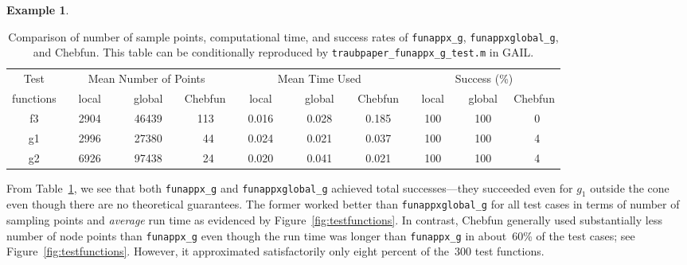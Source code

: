 \documentclass[review]{elsarticle}
\theoremstyle{definition}
\newtheorem{exmp}{Example}
\newcommand{\funappxg}{\texttt{funappx\_g}\xspace}
\newcommand{\funappxglobalg}{\texttt{funappxglobal\_g\xspace}}
\begin{document}
\begin{exmp}
%
\begin{table}[bt]
\centering
\caption{Comparison of number of sample points, computational time,  and success
rates of \funappxg, \funappxglobalg, and Chebfun.
This table can be conditionally reproduced by
\texttt{traubpaper\_funappx\_g\_test.m} in GAIL.}
\label{tab:localVsGlobalVsChebfun}
{\footnotesize
\setlength{\tabcolsep}{.3em} %
		\begin{tabular}{ccrccrccrccrccrccrccrccrccrc}		
			Test      &    \multicolumn{9}{c}{Mean Number of Points}   & \multicolumn{9}{c}{Mean Time Used}  & \multicolumn{9}{c}{Success (\%)}
			\\  functions &  \multicolumn{3}{c}{local}  &  \multicolumn{3}{c}{global }  &  \multicolumn{3}{c}{Chebfun }  & \multicolumn{3}{c}{local}  &  \multicolumn{3}{c}{global }  &  \multicolumn{3}{c}{Chebfun } & \multicolumn{3}{c}{local}  &  \multicolumn{3}{c}{global }  &  \multicolumn{3}{c}{Chebfun } 
\\ \toprule
          f3   &&   2904  &&&   46439   &&&   113    &&&   0.016   &&&     0.028    &&&   0.185 &&&    100   &&&  100   &&&  0  
\\        g1   &&   2996  &&&   27380   &&&    44    &&&   0.024   &&&     0.021    &&&   0.037 &&&    100   &&&  100   &&&  4  
\\        g2   &&   6926  &&&   97438   &&&    24    &&&   0.020   &&&     0.041    &&&   0.021 &&&    100   &&&  100    &&&  4  	
\end{tabular}
}
\end{table}
%

From Table~\ref{tab:localVsGlobalVsChebfun}, we see that both \funappxg{} and
\funappxglobalg{} achieved total successes---they succeeded
even for  $g_1$ outside the cone even though there are no theoretical guarantees.
The former worked better than
\funappxglobalg{} for all test cases in terms of number of sampling points and
\emph{average} run time as evidenced by Figure~\ref{fig:testfunctions}.
In contrast, Chebfun generally used substantially less number of node points
than \funappxg{} even though the run time was longer than \funappxg{} in
about~60\% of the test cases; see Figure~\ref{fig:testfunctions}.
However, it approximated satisfactorily only eight percent of the~300 test
functions.



\end{exmp}
\end{document}
